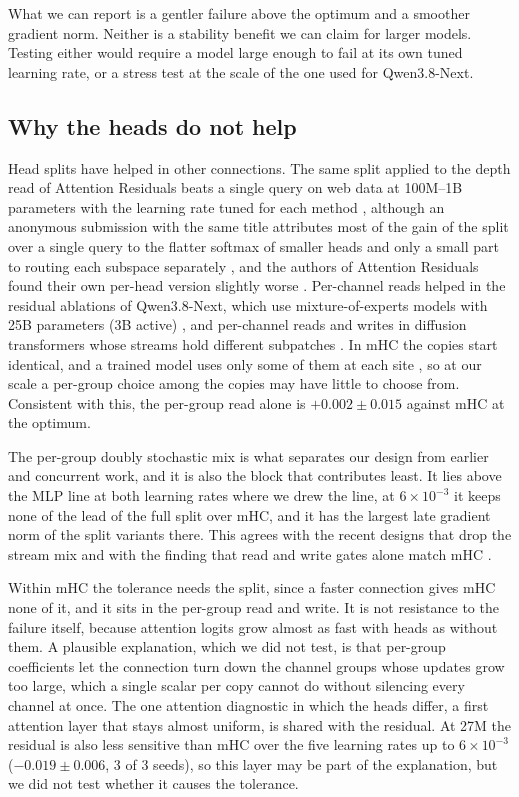 \documentclass[11pt, a4paper]{article}
\newcommand{\lr}[1]{\ensuremath{#1 \times 10^{-3}}}
\begin{document}
What we can report is a gentler failure above the optimum and a smoother gradient norm. Neither is a stability benefit we can
claim for larger models. Testing either would require a model large enough to fail at its own tuned learning rate, or a stress test
at the scale of the one used for Qwen3.8-Next.

\subsection{Why the heads do not help}
\label{sec:elsewhere}
\label{sec:mix}

Head splits have helped in other connections. The same split applied to the depth read of Attention Residuals beats a single
query on web data at 100M--1B parameters with the learning rate tuned for each method \citep{luo2026mhar}, although an anonymous submission with the same title attributes most
of the gain of the split over a single query to the flatter softmax of smaller heads and only a small part to routing each
subspace separately \citep{anon2026mharICLR}, and the authors of Attention Residuals found their own per-head version slightly
worse \citep{kimi2026attnres}. Per-channel reads helped in the residual ablations of Qwen3.8-Next, which use mixture-of-experts models
with 25B parameters (3B active) \citep{qiu2026qwen38next}, and per-channel reads and writes in diffusion transformers whose streams hold different
subpatches \citep{liang2026sihc}. In mHC the copies start identical, and a trained model uses only some of them at each site \citep{zhao2026howdoesmhc,
alimaskina2026streamcollapse}, so at our scale a per-group choice among the copies may have little to choose from. Consistent with
this, the per-group read alone is $+0.002 \pm 0.015$ against mHC at the optimum.

The per-group doubly stochastic mix is what separates our design from earlier and concurrent work, and it is also the block that
contributes least. It lies above the MLP line at both learning rates where we drew the line, at \lr{6} it keeps none of the lead of the full split over mHC, and it has the largest late gradient
norm of the split variants there. This agrees with the recent designs that
drop the stream mix \citep{qiu2026qwen38next, ge2026chimera, liang2026sihc} and with the finding that read and write gates alone
match mHC \citep{anon2026simplehc}.

Within mHC the tolerance needs the split, since a faster connection gives mHC none of it, and it sits in the per-group read and write. It is not
resistance to the failure itself, because attention logits grow almost as fast with heads as without them. A plausible explanation, which we
did not test, is that per-group coefficients let the connection turn down the channel groups whose updates grow too large, which a
single scalar per copy cannot do without silencing every channel at once. The one attention diagnostic in which the heads differ, a first
attention layer that stays almost uniform, is shared with the residual. At 27M the residual is also less sensitive than mHC over
the five learning rates up to \lr{6} ($-0.019 \pm 0.006$, 3 of 3 seeds), so this layer may be part of the explanation, but we did
not test whether it causes the tolerance.
\end{document}
